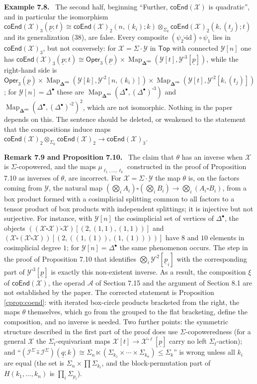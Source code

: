 \documentclass[12pt]{article}
\theoremstyle{plain}
\theoremstyle{definition}
\theoremstyle{remark}
\newcommand{\Cal}[1]{\mathcal{#1}}
\newcommand{\Oper}{\mathsf{Oper}}
\newcommand{\coend}[1]{\mathsf{coEnd}(#1)}
\newcommand{\bdel}{\mathbf{\Delta}}
\newcommand{\Dres}{\bdel^{\mathsf{res}}}
\newcommand{\circhat}{\hat{\circ}}
\newcommand{\boxcirc}{\mathring{\square}}
\newcommand{\Isym}{\Cal{I}^{\Sigma}}
\newcommand{\id}{\mathrm{id}}
\newcommand{\Map}{\operatorname{Map}}
\newcommand{\corr}[1]{\par\smallskip\noindent\textbf{#1.}\ }
\begin{document}
\corr{Example 7.8} The second half, beginning ``Further, $\coend{\Cal X}$ is quadratic'', and in particular the isomorphism $\coend{\Cal X}_3(\underline p;t)\cong\coend{\Cal X}_2(n,(k_i);k)\otimes_{\Sigma_k}\coend{\Cal X}_2(k,(t_j);t)$ and its generalization (38), are false. Every composite $(\psi_2\boxcirc\id)\circ\psi_1$ lies in $\coend{\Cal X}_3$, but not conversely: for $\Cal X=\Sigma\cdot\Cal Y$ in $\mathsf{Top}$ with connected $\Cal Y[n]$ one has $\coend{\Cal X}_3(\underline p;t)\cong\Oper_3(\underline p)\times\Map_{\Dres}(\Cal Y[t],\Cal Y^{\square3}[\underline p])$, while the right-hand side is $\Oper_3(\underline p)\times\Map_{\Dres}(\Cal Y[k],\Cal Y^{\square2}[n,(k_i)])\times\Map_{\Dres}(\Cal Y[t],\Cal Y^{\square2}[k,(t_j)])$; for $\Cal Y[n]=\Delta^\bullet$ these are $\Map_{\Dres}(\Delta^\bullet,(\Delta^\bullet)^{\square3})$ and $\Map_{\Dres}(\Delta^\bullet,(\Delta^\bullet)^{\square2})^2$, which are not isomorphic. Nothing in the paper depends on this. The sentence should be deleted, or weakened to the statement that the compositions induce maps $\coend{\Cal X}_2\otimes_{\Sigma_k}\coend{\Cal X}_2\to\coend{\Cal X}_3$.

\corr{Remark 7.9 and Proposition 7.10} The claim that $\theta$ has an inverse when $\Cal X$ is $\Sigma$-copowered, and the maps $\mu_{\ell_1,\dots,\ell_k}$ constructed in the proof of Proposition 7.10 as inverses of $\theta$, are incorrect. For $\Cal X=\Sigma\cdot\Cal Y$ the map $\theta$ is, on the factors coming from $\Cal Y$, the natural map $(\bigotimes_iA_i)\square(\bigotimes_iB_i)\to\bigotimes_i(A_i\square B_i)$, from a box product formed with a cosimplicial splitting common to all factors to a tensor product of box products with independent splittings; it is injective but not surjective. For instance, with $\Cal Y[n]$ the cosimplicial set of vertices of $\Delta^\bullet$, the objects $((\Cal X\boxcirc\Cal X)\boxcirc\Cal X)[(2,(1,1),(1,1))]$ and $(\Cal X\boxcirc(\Cal X\boxcirc\Cal X))[(2,((1,(1)),(1,(1))))]$ have $8$ and $10$ elements in cosimplicial degree $1$; for $\Cal Y[n]=\Delta^\bullet$ the same phenomenon occurs. The step in the proof of Proposition 7.10 that identifies $\bigotimes_i\Cal Y^{\square2}[\underline p_i]$ with the corresponding part of $\Cal Y^{\square3}[\underline p]$ is exactly this non-existent inverse. As a result, the composition $\xi$ of $\coend{\Cal X}$, the operad $\Cal A$ of Section 7.15 and the argument of Section 8.1 are not established by the paper. The corrected statement is Proposition \ref{cprop:coend}: with iterated box-circle products bracketed from the right, the maps $\theta$ themselves, which go from the grouped to the flat bracketing, define the composition, and no inverse is needed. Two further points: the symmetric structure described in the first part of the proof does use $\Sigma$-copoweredness (for a general $\Cal X$ the $\Sigma_t$-equivariant maps $\Cal X[t]\to\Cal X^{\boxcirc\ell}[\underline p]$ carry no left $\Sigma_t$-action); and ``$(\Isym\circhat\Isym)(\underline q;k)\cong\Sigma_n\ltimes(\Sigma_{k_1}\times\cdots\times\Sigma_{k_n})\leq\Sigma_k$'' is wrong unless all $k_i$ are equal (the set is $\Sigma_n\times\prod\Sigma_{k_i}$, and the block-permutation part of $H(k_1,\dots,k_n)$ is $\prod_i\Sigma_{p_i}$).
\end{document}
